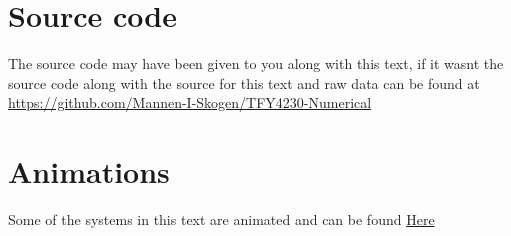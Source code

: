 \documentclass[10pt,a4paper,aps,twocolumn,secnumarabic,numerical,balancelastpage,nofootinbib,superscriptaddress]{revtex4-2}
\begin{document}
		\section{Source code}
		
			The source code may have been given to you along with this text, if it wasnt the source code along with the source for this text and raw data can be found at \href{https://github.com/Mannen-I-Skogen/TFY4230-Numerical}{https://github.com/Mannen-I-Skogen/TFY4230-Numerical}
			
		\section{Animations}
		
			Some of the systems in this text are animated and can be found \href{https://folk.ntnu.no/stiansjo/particles}{Here}
	
	
\end{document}
